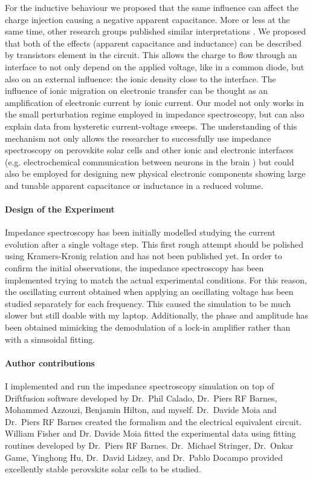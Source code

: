 For the inductive behaviour we proposed that the same influence can affect the charge injection causing a negative apparent capacitance.
More or less at the same time, other research groups published similar interpretations \cite{Ebadi2019,Jacobs2018}.
We proposed that both of the effects (apparent capacitance and inductance) can be described by transistors element in the circuit.
This allows the charge to flow through an interface to not only depend on the applied voltage, like in a common diode, but also on an external influence: the ionic density close to the interface.
The influence of ionic migration on electronic transfer can be thought as an amplification of electronic current by ionic current.
Our model not only works in the small perturbation regime employed in impedance spectroscopy, but can also explain data from hysteretic current\hyp{}voltage sweeps.
The understanding of this mechanism not only allows the researcher to successfully use impedance spectroscopy on perovskite solar cells and other ionic and electronic interfaces (e.g. electrochemical communication between neurons in the brain \cite{Cole1956}) but could also be employed for designing new physical electronic components showing large and tunable apparent capacitance or inductance in a reduced volume.

\paragraph{Design of the Experiment}
Impedance spectroscopy has been initially modelled studying the current evolution after a single voltage step.
This first rough attempt should be polished using Kramers\hyp{}Kronig relation and has not been published yet.
In order to confirm the initial observations, the impedance spectroscopy has been implemented trying to match the actual experimental conditions.
For this reason, the oscillating current obtained when applying an oscillating voltage has been studied separately for each frequency.
This caused the simulation to be much slower but still doable with my laptop.
Additionally, the phase and amplitude has been obtained mimicking the demodulation of a lock-in amplifier rather than with a sinusoidal fitting.

\paragraph{Author contributions}
I implemented and run the impedance spectroscopy simulation on top of Driftfusion software developed by Dr.\ Phil Calado, Dr.\ Piers RF Barnes, Mohammed Azzouzi, Benjamin Hilton, and myself.
Dr.\ Davide Moia and Dr.\ Piers RF Barnes created the formalism and the electrical equivalent circuit.
William Fisher and Dr. Davide Moia fitted the experimental data using fitting routines developed by Dr.\ Piers RF Barnes.
Dr.\ Michael Stringer, Dr.\ Onkar Game, Yinghong Hu, Dr.\ David Lidzey, and Dr.\ Pablo Docampo provided excellently stable perovskite solar cells to be studied.


